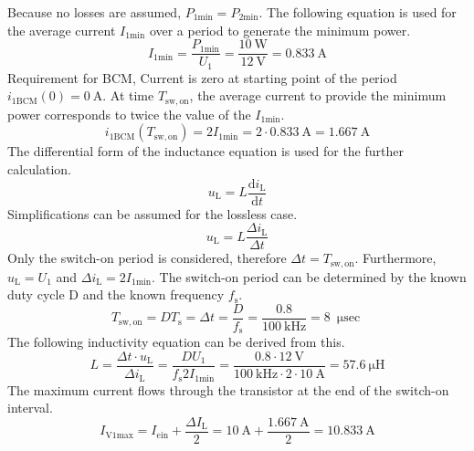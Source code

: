 \begin{solutionblock}
    Because no losses are assumed, $P_{\mathrm{1min}}=P_{\mathrm{2min}}$.
    The following equation is used for the average current $I_{\mathrm{1min}}$ over a period to generate the minimum power.
    \begin{equation}
        I_{\mathrm{1min}} = \frac{P_{\mathrm{1min}}}{U_{\mathrm{1}}} = \frac{\SI{10}{\watt}}{\SI{12}{\volt}}= \SI{0.833}{\ampere}
    \end{equation}
    Requirement for BCM, Current is zero at starting point of the period  $i_\mathrm{1BCM}(0)=\SI{0}{\ampere}$.
    At time $T_{\mathrm{sw,on}}$, the average current to provide the minimum power corresponds to twice the value of the $I_{\mathrm{1min}}$.
    \begin{equation}
        i_\mathrm{1BCM}(T_{\mathrm{sw,on}})= 2I_{\mathrm{1min}}= 2\cdot \SI{0.833}{\ampere} = \SI{1.667}{\ampere}
    \end{equation}
    The differential form of the inductance equation is used for the further calculation.
    \begin{equation}
        u_\mathrm{L}=L\frac{\mathrm{d}i_\mathrm{L}}{\mathrm{d}t}
    \end{equation}
    Simplifications can be assumed for the lossless case.
    \begin{equation}
        u_\mathrm{L}=L\frac{\Delta i_\mathrm{L}}{\Delta t}
    \end{equation}
    Only the switch-on period is considered, therefore $\Delta t = T_{\mathrm{sw,on}}$. Furthermore, $u_\mathrm{L}=U_\mathrm{1}$ and $\Delta i_\mathrm{L} = 2 I_\mathrm{1min}$.
    The switch-on period can be determined by the known duty cycle D and the known frequency $f_{\mathrm{s}}$.
    \begin{equation}
        T_{\mathrm{sw,on}} = D T_{\mathrm{s}} = \Delta t = \frac{D}{f_{\mathrm{s}}} = \frac{0.8}{\SI{100}{\kilo\hertz}}=\SI{8}{\micro\sec}
    \end{equation}
    The following inductivity equation can be derived from this.
    \begin{equation}
        L=\frac{\Delta t \cdot u_\mathrm{L} }{\Delta i_\mathrm{L}}= \frac{D U_\mathrm{1}}{f_{\mathrm{s}}2I_{\mathrm{1min}}} = \frac{0.8 \cdot \SI{12}{\volt}}{\SI{100}{\kilo\hertz\cdot 2\cdot \SI{10}{\ampere}}} = \SI{57.6}{\micro\henry}
    \end{equation}
    The maximum current flows through the transistor at the end of the switch-on interval.
    \begin{equation}
        I_\mathrm{V1max} = I_\mathrm{ein} + \frac{\Delta I_\mathrm{L}}{2}=\SI{10}{\ampere}+\frac{\SI{1.667}{\ampere}}{2} = \SI{10.833}{\ampere}
    \end{equation}
\end{solutionblock}

